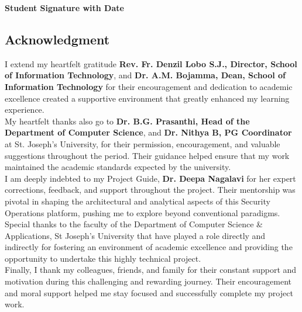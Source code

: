 \documentclass[12pt, a4paper]{report}
\begin{document}
	\begin{flushright}
		\textbf{Student Signature with Date}\\[0.2cm]
	\end{flushright}
	
	\begin{center}
		\chapter*{Acknowledgment}
	\end{center}
	
	\onehalfspacing
	I extend my heartfelt gratitude \textbf{Rev. Fr. Denzil Lobo S.J., Director, School of Information Technology}, and \textbf{Dr. A.M. Bojamma, Dean, School of Information Technology} for their encouragement and dedication to academic excellence created a supportive environment that greatly enhanced my learning experience.\\
	
	My heartfelt thanks also go to \textbf{Dr. B.G. Prasanthi, Head of the Department of Computer Science}, and \textbf{Dr. Nithya B, PG Coordinator} at St. Joseph’s University, for their permission, encouragement, and valuable suggestions throughout the period. Their guidance helped ensure that my work maintained the academic standards expected by the university.\\
	
	I am deeply indebted to my Project Guide, \textbf{Dr. Deepa Nagalavi} for her expert corrections, feedback, and support throughout the project. Their mentorship was pivotal in shaping the architectural and analytical aspects of this Security Operations platform, pushing me to explore beyond conventional paradigms.\\
	
	Special thanks to the faculty of the Department of Computer Science \& Applications, St Joseph's University that have played a role directly and indirectly for fostering an environment of academic excellence and providing the opportunity to undertake this highly technical project.\\
	
	Finally, I thank my colleagues, friends, and family for their constant support and motivation during this challenging and rewarding journey. Their encouragement and moral support helped me stay focused and successfully complete my project work.
	
	\clearpage
	
\end{document}

